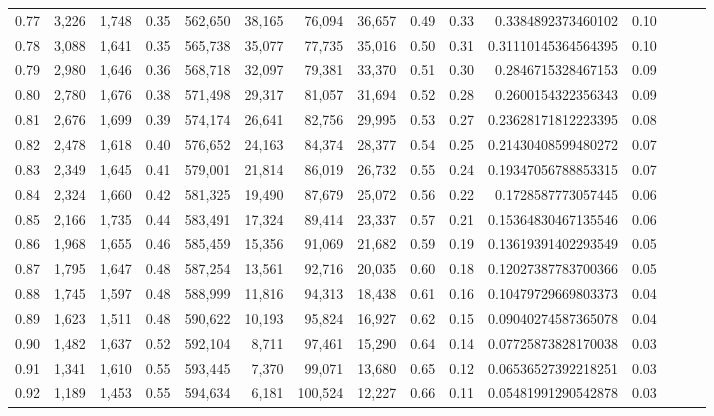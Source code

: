 \begin{tabular}{rrrrrrrrrrrrrrr}
0.77 &  3,226 &  1,748 &  0.35 &  562,650 &   38,165 &   76,094 &   36,657 &  0.49 &  0.33 &    0.3384892373460102 &      0.10 \\
0.78 &  3,088 &  1,641 &  0.35 &  565,738 &   35,077 &   77,735 &   35,016 &  0.50 &  0.31 &   0.31110145364564395 &      0.10 \\
0.79 &  2,980 &  1,646 &  0.36 &  568,718 &   32,097 &   79,381 &   33,370 &  0.51 &  0.30 &    0.2846715328467153 &      0.09 \\
0.80 &  2,780 &  1,676 &  0.38 &  571,498 &   29,317 &   81,057 &   31,694 &  0.52 &  0.28 &    0.2600154322356343 &      0.09 \\
0.81 &  2,676 &  1,699 &  0.39 &  574,174 &   26,641 &   82,756 &   29,995 &  0.53 &  0.27 &   0.23628171812223395 &      0.08 \\
0.82 &  2,478 &  1,618 &  0.40 &  576,652 &   24,163 &   84,374 &   28,377 &  0.54 &  0.25 &   0.21430408599480272 &      0.07 \\
0.83 &  2,349 &  1,645 &  0.41 &  579,001 &   21,814 &   86,019 &   26,732 &  0.55 &  0.24 &   0.19347056788853315 &      0.07 \\
0.84 &  2,324 &  1,660 &  0.42 &  581,325 &   19,490 &   87,679 &   25,072 &  0.56 &  0.22 &    0.1728587773057445 &      0.06 \\
0.85 &  2,166 &  1,735 &  0.44 &  583,491 &   17,324 &   89,414 &   23,337 &  0.57 &  0.21 &   0.15364830467135546 &      0.06 \\
0.86 &  1,968 &  1,655 &  0.46 &  585,459 &   15,356 &   91,069 &   21,682 &  0.59 &  0.19 &   0.13619391402293549 &      0.05 \\
0.87 &  1,795 &  1,647 &  0.48 &  587,254 &   13,561 &   92,716 &   20,035 &  0.60 &  0.18 &   0.12027387783700366 &      0.05 \\
0.88 &  1,745 &  1,597 &  0.48 &  588,999 &   11,816 &   94,313 &   18,438 &  0.61 &  0.16 &   0.10479729669803373 &      0.04 \\
0.89 &  1,623 &  1,511 &  0.48 &  590,622 &   10,193 &   95,824 &   16,927 &  0.62 &  0.15 &   0.09040274587365078 &      0.04 \\
0.90 &  1,482 &  1,637 &  0.52 &  592,104 &    8,711 &   97,461 &   15,290 &  0.64 &  0.14 &   0.07725873828170038 &      0.03 \\
0.91 &  1,341 &  1,610 &  0.55 &  593,445 &    7,370 &   99,071 &   13,680 &  0.65 &  0.12 &   0.06536527392218251 &      0.03 \\
0.92 &  1,189 &  1,453 &  0.55 &  594,634 &    6,181 &  100,524 &   12,227 &  0.66 &  0.11 &   0.05481991290542878 &      0.03 \\

\end{tabular}
